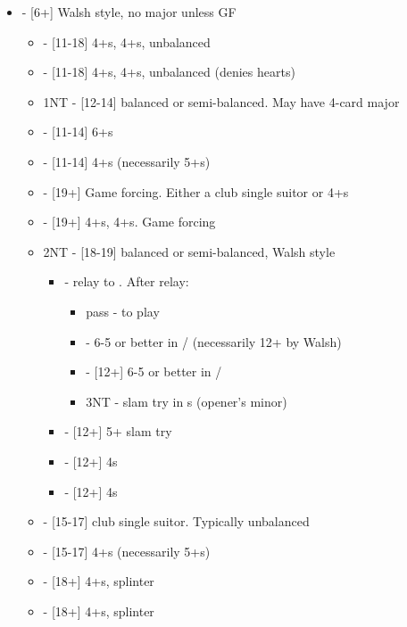 \documentclass[12pt]{report}
\newcommand{\ul}[1]{\begin{itemize}#1\end{itemize}}
\newcommand{\li}{\item[~]}
\begin{document}
    \ul {
        \li {} - [6+] Walsh style, no major unless GF
        \ul {
            \li \he1 - [11-18] 4+\cl{}s, 4+\he{}s, unbalanced
            \li \sp1 - [11-18] 4+\cl{}s, 4+\sp{}s, unbalanced (denies hearts)
            \li 1NT - [12-14] balanced or semi-balanced.  May have 4-card major
            \li \cl2 - [11-14] 6+\cl{}s
            \li \di2 - [11-14] 4+\di{}s (necessarily 5+\cl{}s)
            \li \he2 - [19+] Game forcing.  Either a club single suitor or 4+\he{}s
            \li \sp2 - [19+] 4+\cl{}s, 4+\sp{}s.  Game forcing
            \li 2NT - [18-19] balanced or semi-balanced, Walsh style
            \ul {
                \li \cl3 - relay to \di{3}.  After relay:
                \ul {
                    \li pass - to play
                    \li \he3 - 6-5 or better in \di{}/\he{} (necessarily 12+ by Walsh)
                    \li \sp3 - [12+] 6-5 or better in \di{}/\sp{}
                    \li 3NT - slam try in \cl{}s (opener's minor)
                }
                \li \di3 - [12+] 5+ slam try
                \li \he3 - [12+] 4\he{}s
                \li \sp3 - [12+] 4\sp{}s
            }
            \li \cl3 - [15-17] club single suitor.  Typically unbalanced
            \li \di3 - [15-17] 4+\di{}s (necessarily 5+\cl{}s)
            \li \he3 - [18+] 4+\di{}s, splinter
            \li \sp3 - [18+] 4+\di{}s, splinter
        }

}
\end{document}
